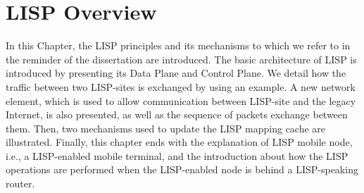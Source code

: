 
\chapter{LISP Overview}
\label{cha:lisp_overview}

\ifpdf
    \graphicspath{{Chapter2/Pics/Raster/}{Chapter2/Pics/PDF/}{Chapter2/}}
\else
    \graphicspath{{Chapter2/Pics/Vector/}{Chapter2/}}
\fi

In this Chapter, the LISP principles and its mechanisms to which we refer to in the reminder of the dissertation are introduced. The basic architecture of LISP is introduced by presenting its Data Plane and Control Plane. We detail how the traffic between two LISP-sites is exchanged by using an example.
A new network element, which is used to allow communication between LISP-site and the legacy Internet, is also presented, as well as the sequence of packets exchange between them. Then, two mechanisms used to update the LISP mapping cache are illustrated. Finally, this chapter ends with the explanation of LISP mobile node, i.e., a LISP-enabled mobile terminal, and the introduction about how the LISP operations are performed when the LISP-enabled node is behind a LISP-speaking router.





